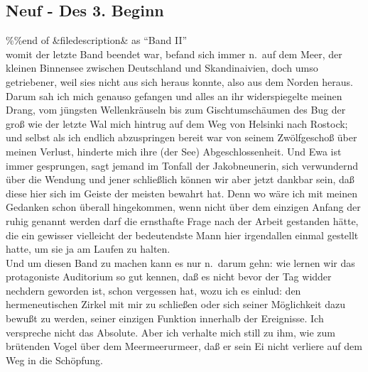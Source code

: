 \documentclass[
]{article}
\author{}
\date{\vspace{-2.5em}}
\begin{document}
\subsection{Neuf - Des 3. Beginn}\label{neuf---des-3.-beginn}

\%\%end of \&filedescription\& as ``Band II''\\
womit der letzte Band beendet war, befand sich immer n.~auf dem Meer,
der kleinen Binnensee zwischen Deutschland und Skandinaivien, doch umso
getriebener, weil sies nicht aus sich heraus konnte, also aus dem Norden
heraus. Darum sah ich mich genauso gefangen und alles an ihr
widerspiegelte meinen Drang, vom jüngsten Wellenkräuseln bis zum
Gischtumschäumen des Bug der groß wie der letzte Wal mich hintrug auf
dem Weg von Helsinki nach Rostock; und selbst als ich endlich
abzuspringen bereit war von seinem Zwölfgeschoß über meinen Verlust,
hinderte mich ihre (der See) Abgeschlossenheit. Und Ewa ist immer
gesprungen, sagt jemand im Tonfall der Jakobneunerin, sich verwundernd
über die Wendung und jener schließlich können wir aber jetzt dankbar
sein, daß diese hier sich im Geiste der meisten bewahrt hat. Denn wo
wäre ich mit meinen Gedanken schon überall hingekommen, wenn nicht über
dem einzigen Anfang der ruhig genannt werden darf die ernsthafte Frage
nach der Arbeit gestanden hätte, die ein gewisser vielleicht der
bedeutendste Mann hier irgendallen einmal gestellt hatte, um sie ja am
Laufen zu halten.\\
Und um diesen Band zu machen kann es nur n.~darum gehn: wie lernen wir
das protagoniste Auditorium so gut kennen, daß es nicht bevor der Tag
widder nechdern geworden ist, schon vergessen hat, wozu ich es einlud:
den hermeneutischen Zirkel mit mir zu schließen oder sich seiner
Möglichkeit dazu bewußt zu werden, seiner einzigen Funktion innerhalb
der Ereignisse. Ich verspreche nicht das Absolute. Aber ich verhalte
mich still zu ihm, wie zum brütenden Vogel über dem Meermeerurmeer, daß
er sein Ei nicht verliere auf dem Weg in die Schöpfung.
\end{document}
